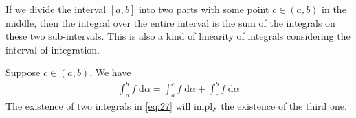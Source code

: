 \documentclass[thmcnt=section, 12pt]{my-elegantbook}
\begin{document}

\par If we divide the interval $[a, b]$ into two parts with some point $c \in (a, b)$ in the middle, then the integral over the entire interval is the sum of the integrals on these two sub-intervals. This is also a kind of linearity of integrals considering the interval of integration.

\begin{lemma}
    Suppose $c \in (a, b)$. We have
    \begin{align}
        \int_a^b f \; \mathrm{d}\alpha
        = \int_a^c f \; \mathrm{d}\alpha
        + \int_c^b f \; \mathrm{d}\alpha
        \label{eq:27}
    \end{align}
    The existence of two integrals in \eqref{eq:27} will imply the existence of the third one.
\end{lemma}
\end{document}
